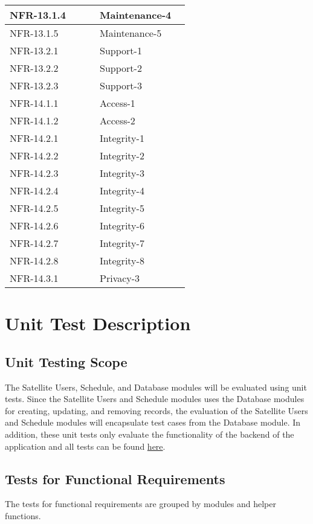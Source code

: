 \documentclass[12pt, titlepage]{article}
\begin{document}
\begin{longtable}{|p{0.45\linewidth}|p{0.45\linewidth}|}
\hline
NFR-13.1.4 & Maintenance-4 \\
\hline
NFR-13.1.5 & Maintenance-5 \\
\hline
NFR-13.2.1 & Support-1 \\
\hline
NFR-13.2.2 & Support-2 \\
\hline
NFR-13.2.3 & Support-3 \\
\hline
NFR-14.1.1 & Access-1 \\
\hline
NFR-14.1.2 & Access-2 \\
\hline
NFR-14.2.1 & Integrity-1 \\
\hline
NFR-14.2.2 & Integrity-2 \\
\hline
NFR-14.2.3 & Integrity-3 \\
\hline
NFR-14.2.4 & Integrity-4 \\
\hline
NFR-14.2.5 & Integrity-5 \\
\hline
NFR-14.2.6 & Integrity-6 \\
\hline
NFR-14.2.7 & Integrity-7 \\
\hline
NFR-14.2.8 & Integrity-8 \\
\hline
NFR-14.3.1 & Privacy-3 \\
\hline
\end{longtable}


\section{Unit Test Description}

\subsection{Unit Testing Scope}
The Satellite Users, Schedule, and Database modules will be evaluated using unit tests. Since the Satellite Users and Schedule modules uses the Database modules for creating, updating, and removing records, the evaluation of the Satellite Users and Schedule modules will encapsulate test cases from the Database module. In addition, these unit tests only evaluate the functionality of the backend of the application and all tests can be found \href{https://github.com/LowerEarthOrbiters/Lower_Earth_Orbiters/tree/main/src/leo-server-app/src/tests}{here}.

\subsection{Tests for Functional Requirements}
The tests for functional requirements are grouped by modules and helper functions.
\end{document}
